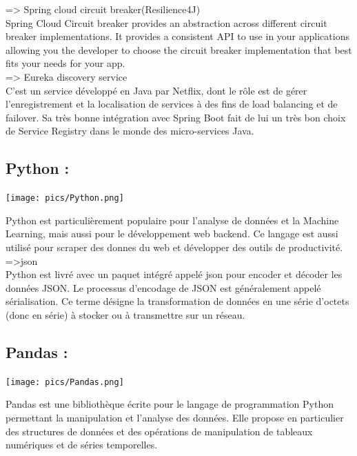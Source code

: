             => Spring cloud circuit breaker(Resilience4J) \\
Spring Cloud Circuit breaker provides an abstraction across different circuit breaker implementations. It provides a consistent API to use in your applications allowing you the developer to choose the circuit breaker implementation that best fits your needs for your app. \\ 

            => Eureka discovery service \\
C'est un service développé en Java par Netflix, dont le rôle est de gérer l'enregistrement et la localisation de services à des fins de load balancing et de failover. Sa très bonne intégration avec Spring Boot fait de lui un très bon choix de Service Registry dans le monde des micro-services Java. \\

\subsection{Python :}
\begin{center}
\texttt{[image: pics/Python.png]}    
\end{center}

Python est particulièrement populaire pour l'analyse de données et la Machine Learning, mais aussi pour le développement web backend. Ce langage est aussi utilisé pour scraper des donnes du web et développer des outils de productivité. \\
         
         =>json \\
Python est livré avec un paquet intégré appelé json pour encoder et décoder les données JSON. Le processus d'encodage de JSON est généralement appelé sérialisation. Ce terme désigne la transformation de données en une série d'octets (donc en série) à stocker ou à transmettre sur un réseau. \\
         

\subsection{Pandas :}
\begin{center}
\texttt{[image: pics/Pandas.png]}    
\end{center}


Pandas est une bibliothèque écrite pour le langage de programmation Python permettant la manipulation et l'analyse des données. Elle propose en particulier des structures de données et des opérations de manipulation de tableaux numériques et de séries temporelles. \\

